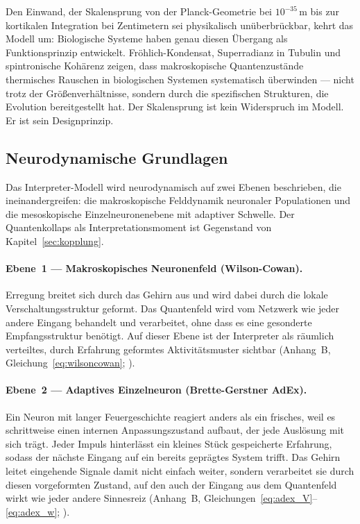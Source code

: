\documentclass[11pt,a4paper]{article}
\begin{document}
Den Einwand, der Skalensprung von der Planck-Geometrie bei $10^{-35}$\,m
bis zur kortikalen Integration bei Zentimetern sei physikalisch unüberbrückbar,
kehrt das Modell um: Biologische Systeme haben genau diesen Übergang als
Funktionsprinzip entwickelt. Fröhlich-Kondensat, Superradianz in Tubulin und
spintronische Kohärenz zeigen, dass makroskopische Quantenzustände thermisches
Rauschen in biologischen Systemen systematisch überwinden — nicht trotz der
Größenverhältnisse, sondern durch die spezifischen Strukturen, die Evolution
bereitgestellt hat. Der Skalensprung ist kein Widerspruch im Modell.
Er ist sein Designprinzip.

\subsection*{Neurodynamische Grundlagen}

Das Interpreter-Modell wird neurodynamisch auf zwei Ebenen beschrieben,
die ineinandergreifen: die makroskopische Felddynamik neuronaler Populationen
und die mesoskopische Einzelneuronenebene mit adaptiver Schwelle. Der
Quantenkollaps als Interpretationsmoment ist Gegenstand von
Kapitel~\ref{sec:kopplung}.

\paragraph{Ebene~1 — Makroskopisches Neuronenfeld (Wilson-Cowan).}
Erregung breitet sich durch das Gehirn aus und wird dabei durch die lokale
Verschaltungsstruktur geformt. Das Quantenfeld wird vom Netzwerk wie jeder
andere Eingang behandelt und verarbeitet, ohne dass es eine gesonderte
Empfangsstruktur benötigt. Auf dieser Ebene ist der Interpreter als räumlich
verteiltes, durch Erfahrung geformtes Aktivitätsmuster sichtbar
(Anhang~B, Gleichung~\eqref{eq:wilsoncowan};
\citealt{wilsoncowan1972}).

\paragraph{Ebene~2 — Adaptives Einzelneuron (Brette-Gerstner AdEx).}
Ein Neuron mit langer Feuergeschichte reagiert anders als ein frisches,
weil es schrittweise einen internen Anpassungszustand aufbaut, der jede
Auslösung mit sich trägt. Jeder Impuls hinterlässt ein kleines Stück
gespeicherte Erfahrung, sodass der nächste Eingang auf ein bereits geprägtes
System trifft. Das Gehirn leitet eingehende Signale damit nicht einfach
weiter, sondern verarbeitet sie durch diesen vorgeformten Zustand, auf den
auch der Eingang aus dem Quantenfeld wirkt wie jeder andere Sinnesreiz
(Anhang~B, Gleichungen~\eqref{eq:adex_V}–\eqref{eq:adex_w};
\citealt{brettegerstner2005}).
\end{document}
